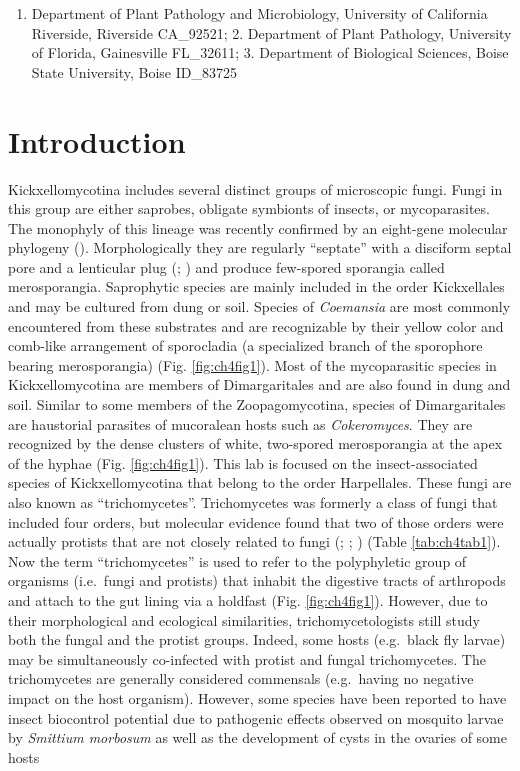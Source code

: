 \documentclass[]{book}
\providecommand{\tightlist}{%
  \setlength{\itemsep}{0pt}\setlength{\parskip}{0pt}}
\begin{document}
\begin{enumerate}
\def\labelenumi{\arabic{enumi}.}
\tightlist
\item
  Department of Plant Pathology and Microbiology, University of California Riverside, Riverside CA\_92521; 2. Department of Plant Pathology, University of Florida, Gainesville FL\_32611; 3. Department of Biological Sciences, Boise State University, Boise ID\_83725
\end{enumerate}

\hypertarget{introduction-2}{%
\section{Introduction}\label{introduction-2}}

Kickxellomycotina includes several distinct groups of microscopic fungi. Fungi in this group are either saprobes, obligate symbionts of insects, or mycoparasites. The monophyly of this lineage was recently confirmed by an eight-gene molecular phylogeny (\citet{Tretter_2014}). Morphologically they are regularly ``septate'' with a disciform septal pore and a lenticular plug (\citet{Hibbett_2007}; \citet{Spatafora_2016}) and produce few-spored sporangia called merosporangia. Saprophytic species are mainly included in the order Kickxellales and may be cultured from dung or soil. Species of \emph{Coemansia} are most commonly encountered from these substrates and are recognizable by their yellow color and comb-like arrangement of sporocladia (a specialized branch of the sporophore bearing merosporangia) (Fig. \ref{fig:ch4fig1}). Most of the mycoparasitic species in Kickxellomycotina are members of Dimargaritales and are also found in dung and soil. Similar to some members of the Zoopagomycotina, species of Dimargaritales are haustorial parasites of mucoralean hosts such as \emph{Cokeromyces}. They are recognized by the dense clusters of white, two-spored merosporangia at the apex of the hyphae (Fig. \ref{fig:ch4fig1}). This lab is focused on the insect-associated species of Kickxellomycotina that belong to the order Harpellales. These fungi are also known as ``trichomycetes''. Trichomycetes was formerly a class of fungi that included four orders, but molecular evidence found that two of those orders were actually protists that are not closely related to fungi (\citet{Benny_2000}; \citet{Cafaro_2005}; \citet{Ustinova_2000}) (Table \ref{tab:ch4tab1}). Now the term ``trichomycetes'' is used to refer to the polyphyletic group of organisms (i.e.~fungi and protists) that inhabit the digestive tracts of arthropods and attach to the gut lining via a holdfast (Fig. \ref{fig:ch4fig1}). However, due to their morphological and ecological similarities, trichomycetologists still study both the fungal and the protist groups. Indeed, some hosts (e.g.~black fly larvae) may be simultaneously co-infected with protist and fungal trichomycetes. The trichomycetes are generally considered commensals (e.g.~having no negative impact on the host organism). However, some species have been reported to have insect biocontrol potential due to pathogenic effects observed on mosquito larvae by \emph{Smittium morbosum} as well as the development of cysts in the ovaries of some hosts 
\end{document}
